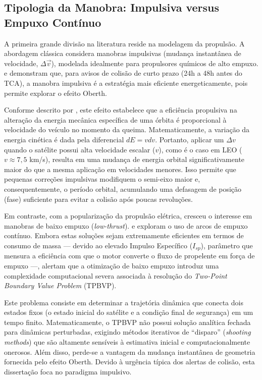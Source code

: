 \subsection{Tipologia da Manobra: Impulsiva versus Empuxo Contínuo}

A primeira grande divisão na literatura reside na modelagem da propulsão. A abordagem clássica considera manobras impulsivas (mudança instantânea de velocidade, $\Delta \vec{v}$), modelada idealmente para propulsores químicos de alto empuxo.  e  demonstram que, para avisos de colisão de curto prazo (24h a 48h antes do TCA), a manobra impulsiva é a estratégia mais eficiente energeticamente, pois permite explorar o efeito Oberth.

Conforme descrito por , este efeito estabelece que a eficiência propulsiva na alteração da energia mecânica específica de uma órbita é proporcional à velocidade do veículo no momento da queima. Matematicamente, a variação da energia cinética é dada pela diferencial $dE = v dv$. Portanto, aplicar um $\Delta v$ quando o satélite possui alta velocidade escalar ($v$), como é o caso em LEO ($v \approx 7,5$ km/s), resulta em uma mudança de energia orbital significativamente maior do que a mesma aplicação em velocidades menores. Isso permite que pequenas correções impulsivas modifiquem o semi-eixo maior e, consequentemente, o período orbital, acumulando uma defasagem de posição (fase) suficiente para evitar a colisão após poucas revoluções.

Em contraste, com a popularização da propulsão elétrica, cresceu o interesse em manobras de baixo empuxo (\textit{low-thrust}).  e  exploram o uso de arcos de empuxo contínuo. Embora estas soluções sejam extremamente eficientes em termos de consumo de massa — devido ao elevado Impulso Específico ($I_{sp}$), parâmetro que mensura a eficiência com que o motor converte o fluxo de propelente em força de empuxo \cite{Sutton2016} —,  alertam que a otimização de baixo empuxo introduz uma complexidade computacional severa associada à resolução do \textit{Two-Point Boundary Value Problem} (TPBVP).

Este problema consiste em determinar a trajetória dinâmica que conecta dois estados fixos (o estado inicial do satélite e a condição final de segurança) em um tempo finito. Matematicamente, o TPBVP não possui solução analítica fechada para dinâmicas perturbadas, exigindo métodos iterativos de ``disparo'' (\textit{shooting methods}) que são altamente sensíveis à estimativa inicial e computacionalmente onerosos. Além disso, perde-se a vantagem da mudança instantânea de geometria fornecida pelo efeito Oberth. Devido à urgência típica dos alertas de colisão, esta dissertação foca no paradigma impulsivo.

